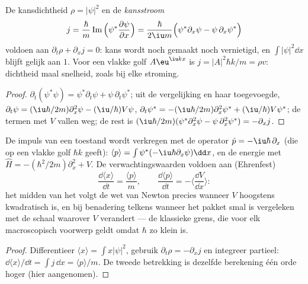 \begin{proposition}\label{prop:b2:schrodinger-wave-functions:current}
De kansdichtheid $\rho = |\psi|^2$ en de \emph{kansstroom}
\[
j = \frac{\hbar}{m}\operatorname{Im}\Big(\psi^*\frac{\partial\psi}{\partial x}\Big)
= \frac{\hbar}{2\iu m}\Big(\psi^*\partial_x\psi - \psi\,\partial_x\psi^*\Big)
\]
voldoen aan $\partial_t\rho + \partial_xj = 0$: kans wordt noch gemaakt noch
vernietigd, en $\int|\psi|^2\dd x$ blijft gelijk aan $1$. Voor een vlakke golf
$A\eu^{\iu kx}$ is $j = |A|^2\hbar k/m = \rho v$: dichtheid maal snelheid, zoals bij
elke stroming.
\end{proposition}

\begin{proof}
$\partial_t(\psi^*\psi) = \psi^*\partial_t\psi + \psi\,\partial_t\psi^*$; uit de
vergelijking en haar toegevoegde,
$\partial_t\psi = (\iu\hbar/2m)\partial_x^2\psi -
(\iu/\hbar)V\psi$,
$\partial_t\psi^* = -(\iu\hbar/2m)\partial_x^2\psi^* +
(\iu/\hbar)V\psi^*$;
de termen met $V$ vallen weg; de rest is
$(\iu\hbar/2m)(\psi^*
\partial_x^2\psi - \psi\,\partial_x^2\psi^*) = -\partial_xj$.
\end{proof}

\begin{proposition}\label{prop:b2:schrodinger-wave-functions:ehrenfest}
De impuls van een toestand wordt verkregen met de operator
$\hat p =
-\iu\hbar\,\partial_x$ (die op een vlakke golf $\hbar k$ geeft):
$\langle
p\rangle = \int\psi^*(-\iu\hbar\partial_x\psi)\dd x$, en de energie
met $\hat H
= -(\hbar^2/2m)\partial_x^2 + V$. De verwachtingswaarden voldoen
aan
(Ehrenfest)
\[
\frac{\dd\langle x\rangle}{\dd t} = \frac{\langle p\rangle}{m}, \qquad
\frac{\dd\langle p\rangle}{\dd t} = -\Big\langle\frac{\dd V}{\dd x}\Big\rangle :
\]
het midden van het  volgt de wet van Newton precies wanneer $V$
hoogstens kwadratisch is, en bij benadering telkens wanneer het pakket smal is
vergeleken met de schaal waarover $V$ verandert --- de klassieke grens,
die voor elk macroscopisch voorwerp geldt omdat $\hbar$ zo klein is.
\end{proposition}

\begin{proof}
Differentieer $\langle x\rangle = \int x|\psi|^2$, gebruik
$\partial_t\rho =
-\partial_xj$ en integreer partieel:
$\dd\langle x\rangle/\dd t = \int j\,\dd x
= \langle p\rangle/m$. De tweede
betrekking is dezelfde berekening één
orde hoger (hier aangenomen).
\end{proof}

